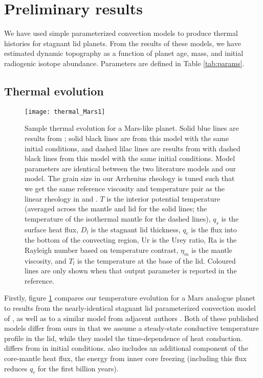 \section{Preliminary results}\label{sec:results}


We have used simple parameterized convection models to produce thermal histories for stagnant lid planets. From the results of these models, we have estimated dynamic topography as a function of planet age, mass, and initial radiogenic isotope abundance. Parameters are defined in Table \ref{tab:params}.

\subsection{Thermal evolution}\label{sec:thermal}

\begin{figure}
  \centering
  \texttt{[image: thermal\_Mars1]}
\caption{Sample thermal evolution for a Mars-like planet. Solid blue lines are results from \citet{Thiriet2019}; solid black lines are from this model with the same initial conditions, and dashed lilac lines are results from \citet{Breuer2010} with dashed black lines from this model with the same initial conditions. Model parameters are identical between the two literature models and our model. The grain size in our Arrhenius rheology is tuned such that we get the same reference viscosity and temperature pair as the linear rheology in \citet{Thiriet2019} and \citet{Breuer2010}. $T$ is the interior potential temperature (averaged across the mantle and lid for the solid lines; the temperature of the isothermal mantle for the dashed lines), $q_{s}$ is the surface heat flux, $D_l$ is the stagnant lid thickness, $q_{c}$ is the flux into the bottom of the convecting region, Ur is the Urey ratio, Ra is the Rayleigh number based on temperature contrast, $\eta_m$ is the mantle viscosity, and $T_l$ is the temperature at the base of the lid. Coloured lines are only shown when that output parameter is reported in the reference. %
}
\label{fig:thermal}
\end{figure}

Firstly, figure \ref{fig:thermal} compares our temperature evolution for a Mars analogue planet to results from the nearly-identical stagnant lid parameterized convection model of \citet{Thiriet2019}, as well as to a similar model from adjacent authors \citep{Breuer2010}. Both of these published models differ from ours in that we assume a steady-state conductive temperature profile in the lid, while they model the time-dependence of heat conduction. \citet{Breuer2010} differs from \citet{Thiriet2019} in initial conditions. \citet{Breuer2010} also includes an additional component of the core-mantle heat flux, the energy from inner core freezing (including this flux reduces $q_c$ for the first billion years). 


